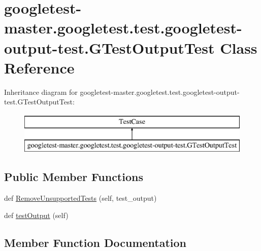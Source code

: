 \hypertarget{classgoogletest-master_1_1googletest_1_1test_1_1googletest-output-test_1_1_g_test_output_test}{}\section{googletest-\/master.googletest.\+test.\+googletest-\/output-\/test.G\+Test\+Output\+Test Class Reference}
\label{classgoogletest-master_1_1googletest_1_1test_1_1googletest-output-test_1_1_g_test_output_test}
Inheritance diagram for googletest-\/master.googletest.\+test.\+googletest-\/output-\/test.G\+Test\+Output\+Test\+:\begin{figure}[H]
\begin{center}
\leavevmode
\includegraphics[height=2.000000cm]{de/d7c/classgoogletest-master_1_1googletest_1_1test_1_1googletest-output-test_1_1_g_test_output_test}
\end{center}
\end{figure}
\subsection*{Public Member Functions}
\begin{DoxyCompactItemize}
\item 
def \mbox{\hyperlink{classgoogletest-master_1_1googletest_1_1test_1_1googletest-output-test_1_1_g_test_output_test_a49027389dd953ae0da7da71569816809}{Remove\+Unsupported\+Tests}} (self, test\+\_\+output)
\item 
def \mbox{\hyperlink{classgoogletest-master_1_1googletest_1_1test_1_1googletest-output-test_1_1_g_test_output_test_a0df9046425dd1a9a691f7cacab87c33b}{test\+Output}} (self)
\end{DoxyCompactItemize}


\subsection{Member Function Documentation}
\mbox{\label{classgoogletest-master_1_1googletest_1_1test_1_1googletest-output-test_1_1_g_test_output_test_a49027389dd953ae0da7da71569816809}} 
